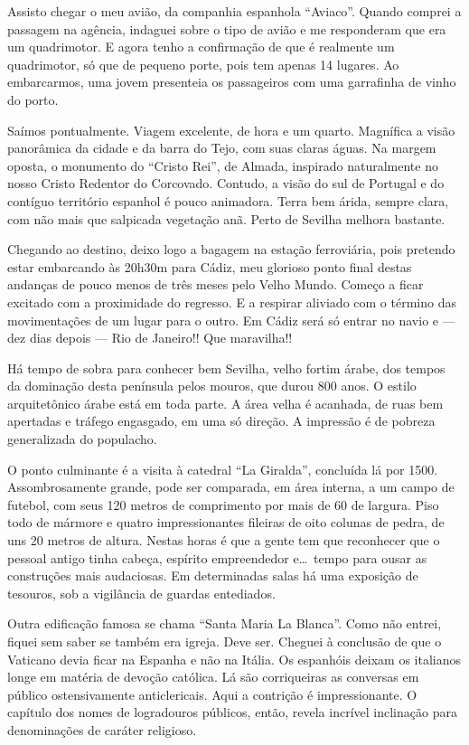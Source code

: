 Assisto chegar o meu avião, da companhia espanhola ``Aviaco''. Quando comprei a passagem na agência, indaguei sobre o tipo de avião e me responderam que era um quadrimotor. E agora tenho a confirmação de que é realmente um quadrimotor, só que de pequeno porte, pois tem apenas 14 lugares. Ao embarcarmos, uma jovem presenteia os passageiros com uma garrafinha de vinho do porto.

Saímos pontualmente. Viagem excelente, de hora e um quarto. Magnífica a visão panorâmica da cidade e da barra do Tejo, com suas claras águas. Na margem oposta, o monumento do ``Cristo Rei'', de Almada, inspirado naturalmente no nosso Cristo Redentor do Corcovado. Contudo, a visão do sul de Portugal e do contíguo território espanhol é pouco animadora. Terra bem árida, sempre clara, com não mais que salpicada vegetação anã. Perto de Sevilha melhora bastante.

Chegando ao destino, deixo logo a bagagem na estação ferroviária, pois pretendo estar embarcando às 20h30m para Cádiz, meu glorioso ponto final destas andanças de pouco menos de três meses pelo Velho Mundo. Começo a ficar excitado com a proximidade do regresso. E a respirar aliviado com o término das movimentações de um lugar para o outro. Em Cádiz será só entrar no navio e --- dez dias depois --- Rio de Janeiro!! Que maravilha!!

Há tempo de sobra para conhecer bem Sevilha, velho fortim árabe, dos tempos da dominação desta península pelos mouros, que durou 800 anos. O estilo arquitetônico árabe está em toda parte. A área velha é acanhada, de ruas bem apertadas e tráfego engasgado, em uma só direção. A impressão é de pobreza generalizada do populacho.

O ponto culminante é a visita à catedral ``La Giralda'', concluída lá por 1500. Assombrosamente grande, pode ser comparada, em área interna, a um campo de futebol, com seus 120 metros de comprimento por mais de 60 de largura. Piso todo de mármore e quatro impressionantes fileiras de oito colunas de pedra, de uns 20 metros de altura. Nestas horas é que a gente tem que reconhecer que o pessoal antigo tinha cabeça, espírito empreendedor e\ldots\ tempo para ousar as construções mais audaciosas. Em determinadas salas há uma exposição de tesouros, sob a vigilância de guardas entediados.

Outra edificação famosa se chama ``Santa Maria La Blanca''. Como não entrei, fiquei sem saber se também era igreja. Deve ser. Cheguei à conclusão de que o Vaticano devia ficar na Espanha e não na Itália. Os espanhóis deixam os italianos longe em matéria de devoção católica. Lá são corriqueiras as conversas em público ostensivamente anticlericais. Aqui a contrição é impressionante. O capítulo dos nomes de logradouros públicos, então, revela incrível inclinação para denominações de caráter religioso.

